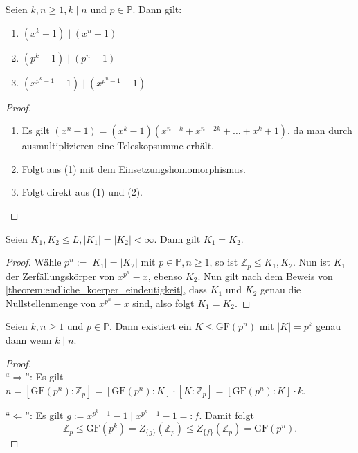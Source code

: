 \begin{lemma}
    Seien $k, n \geq 1, k \mid n$ und $p \in \mathbb{P}$. Dann gilt:
    \begin{enumerate}
        \item $(x^k - 1) \mid (x^n - 1)$
        \item $(p^k - 1) \mid (p^n - 1)$
        \item $(x^{p^k - 1} - 1) \mid (x^{p^n - 1} - 1)$
    \end{enumerate}
\end{lemma}

\begin{proof}{\ }
    \begin{enumerate}
        \item Es gilt $(x^n - 1) = (x^k - 1)(x^{n-k} + x^{n - 2k} + \hdots + x^k + 1)$, da man durch ausmultiplizieren eine Teleskopsumme erhält. 
        \item Folgt aus (1) mit dem Einsetzungshomomorphismus.
        \item Folgt direkt aus (1) und (2).
    \end{enumerate}
\end{proof}

\begin{lemma}
    Seien $K_1, K_2 \leq L, \vert K_1 \vert = \vert K_2 \vert<\infty$. Dann gilt $K_1 = K_2$.
\end{lemma}

\begin{proof}
    Wähle $p^n := \vert K_1 \vert = \vert K_2 \vert$ mit $p \in \mathbb{P}, n \geq 1$, so ist $\mathbb{Z}_p \leq K_1, K_2$. Nun ist $K_1$ der Zerfällungskörper von $x^{p^n} - x$, ebenso $K_2$. Nun gilt nach dem Beweis von \cref{theorem:endliche_koerper_eindeutigkeit}, dass $K_1$ und $K_2$ genau die Nullstellenmenge von $x^{p^n}-x$ sind, also folgt $K_1 = K_2$.
\end{proof}

\begin{proposition}
    Seien $k, n \geq 1$ und $p \in \mathbb{P}$. Dann existiert ein $K \leq \mathrm{GF}(p^n)$ mit $\vert K \vert = p^k$ genau dann wenn $k \mid n$.
\end{proposition}

\begin{proof}{\ } \\
    ``$\Rightarrow$'': Es gilt $n = [\mathrm{GF}(p^n) : \mathbb{Z}_p] = [\mathrm{GF}(p^n) : K] \cdot [K : \mathbb{Z}_p] = [\mathrm{GF}(p^n) : K] \cdot k$.

    ``$\Leftarrow$'': Es gilt $g := x^{p^k - 1} - 1 \mid x^{p^n - 1} - 1 =: f$.
    Damit folgt
    $$ \mathbb{Z}_p \leq \mathrm{GF}(p^k) = Z_{\{g\}}(\mathbb{Z}_p) \leq Z_{\{f\}}(\mathbb{Z}_p) = \mathrm{GF}(p^n). $$
\end{proof}

